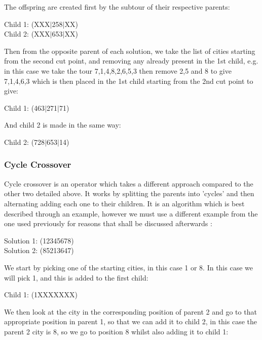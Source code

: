 \documentclass[11pt,a4paper,titlepage]{article}
\begin{document}
The offspring are created first by the subtour of their respective parents:

\begin{center}\Large
Child 1: (XXX$|$258$|$XX)\\
Child 2: (XXX$|$653$|$XX)
\end{center}

Then from the opposite parent of each solution, we take the list of cities starting from the second cut point, and removing any already present in the 1st child, e.g. in this case we take the tour 7,1,4,8,2,6,5,3 then remove 2,5 and 8 to give 7,1,4,6,3 which is then placed in the 1st child starting from the 2nd cut point to give:

\begin{center}\Large
Child 1: (463$|$271$|$71)
\end{center}

And child 2 is made in the same way:

\begin{center}\Large
Child 2: (728$|$653$|$14)
\end{center}

\subsubsection{Cycle Crossover}

Cycle crossover is an operator which takes a different approach compared to the other two detailed above. It works by splitting the parents into 'cycles' and then alternating adding each one to their children. It is an algorithm which is best described through an example, however we must use a different example from the one used previously for reasons that shall be discussed afterwards \cite{GACrossover}:

\begin{center}\Large
Solution 1: (12345678)\\
Solution 2: (85213647)
\end{center}

We start by picking one of the starting cities, in this case 1 or 8. In this case we will pick 1, and this is added to the first child:

\begin{center}\Large
Child 1: (1XXXXXXX)\\
\end{center}

We then look at the city in the corresponding position of parent 2 and go to that appropriate position in parent 1, so that we can add it to child 2, in this case the parent 2 city is 8, so we go to position 8 whilst also adding it to child 1:
\end{document}
